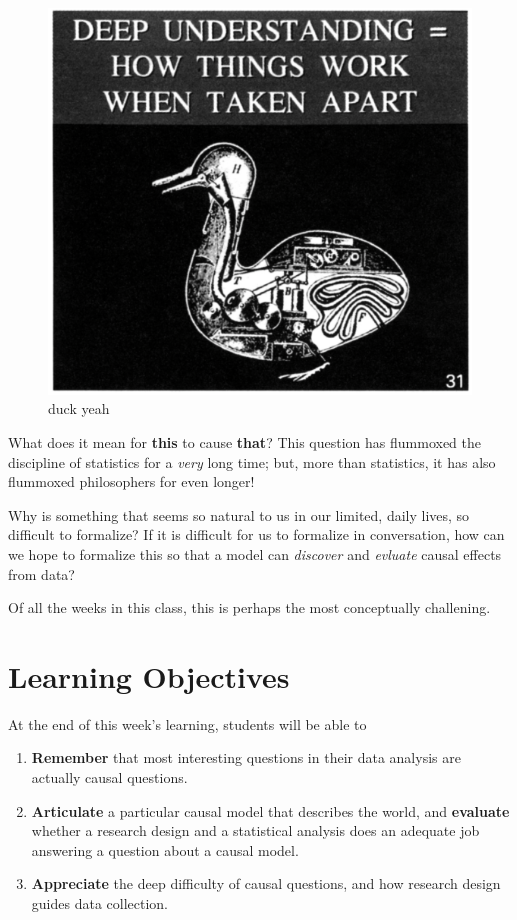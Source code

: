 \documentclass[
  letterpaper,
  DIV=11,
  numbers=noendperiod]{scrreprt}
\providecommand{\tightlist}{%
  \setlength{\itemsep}{0pt}\setlength{\parskip}{0pt}}\usepackage{longtable,booktabs,array}
\begin{document}
\begin{figure}[H]

{\centering \includegraphics{./images/duck.png}

}

\caption{duck yeah}

\end{figure}%

What does it mean for \textbf{this} to cause \textbf{that}? This
question has flummoxed the discipline of statistics for a \emph{very}
long time; but, more than statistics, it has also flummoxed philosophers
for even longer!

Why is something that seems so natural to us in our limited, daily
lives, so difficult to formalize? If it is difficult for us to formalize
in conversation, how can we hope to formalize this so that a model can
\emph{discover} and \emph{evluate} causal effects from data?

Of all the weeks in this class, this is perhaps the most conceptually
challening.

\section{Learning Objectives}\label{learning-objectives-10}

At the end of this week's learning, students will be able to

\begin{enumerate}
\def\labelenumi{\arabic{enumi}.}
\tightlist
\item
  \textbf{Remember} that most interesting questions in their data
  analysis are actually causal questions.
\item
  \textbf{Articulate} a particular causal model that describes the
  world, and \textbf{evaluate} whether a research design and a
  statistical analysis does an adequate job answering a question about a
  causal model.
\item
  \textbf{Appreciate} the deep difficulty of causal questions, and how
  research design guides data collection.
\end{enumerate}
\end{document}
